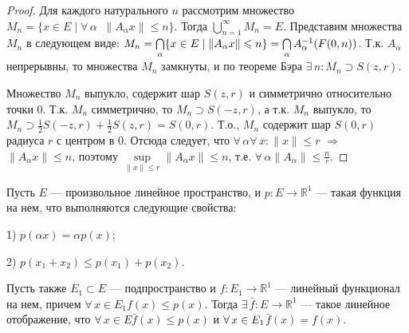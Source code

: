\documentclass[12pt,titlepage, a4paper]{article}
\begin{document}
\begin{proof}
Для каждого натурального $n$ рассмотрим множество $M_n=\{x\in E\mid
\forall\,\alpha\;\;\|A_\alpha x\|\leqslant n\}$. Тогда
$\bigcup\limits_{n=1}^\infty M_n=E$. Представим множества $M_n$ в
следующем виде: $M_n=\bigcap\limits_\alpha \{x\in E\mid \|A_\alpha
x\|\leqslant n\}\p=\bigcap\limits_\alpha A^{-1}_\alpha(F(0,n))$.
Т.к. $A_\alpha$ непрерывны, то множества $M_n$ замкнуты, и по
теореме Бэра $\exists\,n:M_n\supset S(z,r)$.

Множество $M_n$ выпукло, содержит шар $S(z,r)$ и симметрично
относительно точки 0. Т.к. $M_n$ симметрично, то $M_n\supset
S(-z,r)$, а т.к. $M_n$ выпукло, то $M_n\supset \frac 1 2
S(-z,r)+\frac 1 2 S(z,r)=S(0,r)$. Т.о., $M_n$ содержит шар $S(0,r)$
радиуса $r$ с центром в 0. Отсюда следует, что
$\forall\,\alpha$\;\;$\forall\,x:\|x\|\leqslant r$ $\Rightarrow$
$\|A_\alpha x\|\leqslant n$, поэтому $\sup\limits_{\|x\|\leqslant
r}\|A_\alpha x\|\leqslant n$, т.е.
$\forall\,\alpha$\;\;$\|A_\alpha\|\leqslant \frac n r$.
\end{proof}
\lecture

\begin{theorem}
Пусть $E$ --- произвольное линейное пространство, и $p\colon
E\to\mathbb{R}^1$
--- такая функция на нем, что выполняются следующие свойства:

1) $p(\alpha x)=\alpha p(x)$;

2) $p(x_1+x_2)\leqslant p(x_1)+p(x_2)$.

Пусть также $E_1\subset E$ --- подпространство и $f\colon
E_1\to\mathbb{R}^1$ --- линейный функционал на нем, причем
$\forall\,x\in E_1$\;\;$f(x)\leqslant p(x)$. Тогда
$\exists\,\bar{f}\colon E\to \mathbb{R}^1$ --- такое линейное
отображение, что $\forall\,x\in E$\;\;$\bar{f}(x)\leqslant p(x)$ и
$\forall\,x\p\in E_1$\;\;$\bar{f}(x)=f(x)$.
\end{theorem}
\end{document}
